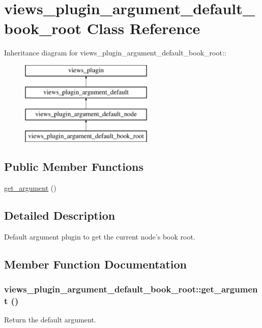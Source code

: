 \hypertarget{classviews__plugin__argument__default__book__root}{
\section{views\_\-plugin\_\-argument\_\-default\_\-book\_\-root Class Reference}
\label{classviews__plugin__argument__default__book__root}
}
Inheritance diagram for views\_\-plugin\_\-argument\_\-default\_\-book\_\-root::\begin{figure}[H]
\begin{center}
\leavevmode
\includegraphics[height=4cm]{classviews__plugin__argument__default__book__root}
\end{center}
\end{figure}
\subsection*{Public Member Functions}
\begin{DoxyCompactItemize}
\item 
\hyperlink{classviews__plugin__argument__default__book__root_a9bc64d2056dce0bc3f98b9d31294fec3}{get\_\-argument} ()
\end{DoxyCompactItemize}


\subsection{Detailed Description}
Default argument plugin to get the current node's book root. 

\subsection{Member Function Documentation}
\hypertarget{classviews__plugin__argument__default__book__root_a9bc64d2056dce0bc3f98b9d31294fec3}{
\subsubsection[{get\_\-argument}]{\setlength{\rightskip}{0pt plus 5cm}views\_\-plugin\_\-argument\_\-default\_\-book\_\-root::get\_\-argument ()}}
\label{classviews__plugin__argument__default__book__root_a9bc64d2056dce0bc3f98b9d31294fec3}
Return the default argument.

